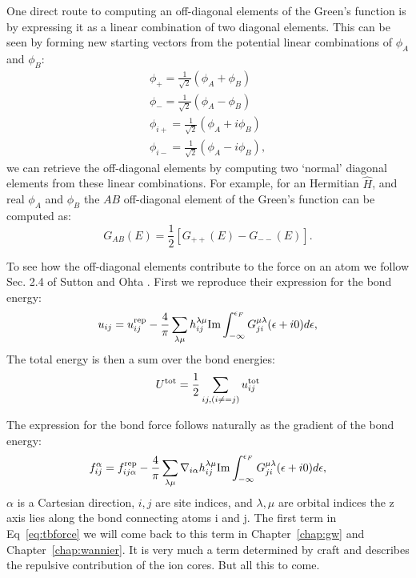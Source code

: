 One direct route to computing an off-diagonal elements of the Green's function
is by expressing it as a linear combination of two diagonal elements. 
This can be seen by forming new starting vectors 
from the potential linear combinations of $\phi_{A}$ and $\phi_{B}$:
%
\begin{align}
\phi_{+} = \frac{1}{\sqrt{2}}(\phi_{A} + \phi_{B})\\
\phi_{-} = \frac{1}{\sqrt{2}}(\phi_{A} - \phi_{B})\\
\phi_{i+} = \frac{1}{\sqrt{2}}(\phi_{A} + i\phi_{B})\\
\phi_{i-} = \frac{1}{\sqrt{2}}(\phi_{A} - i\phi_{B}),
\end{align}
%
we can retrieve the off-diagonal elements by computing 
two `normal' diagonal elements from these linear combinations.
For example, for an Hermitian $\hat{H}$, and real $\phi_{A}$ and $\phi_{B}$ 
the $AB$ off-diagonal element of the Green's function can be computed as:
%
\begin{equation}
\label{eq:offdiaggreen}
G_{AB}(E) = \frac{1}{2}[G_{++}(E)-G_{--}(E)].
\end{equation}

To see how the off-diagonal elements contribute to the force on an 
atom we follow Sec. 2.4 of Sutton \cite{sutton88} and Ohta \cite{ohta87}.
First we reproduce their expression for the bond energy:
%
\begin{equation}
\label{eq:tbenergy}
u_{ij} = u^{\rm rep}_{ij} - \frac{4}{\pi}\sum_{\lambda\mu} 
h_{ij}^{\lambda\mu}{\rm Im}\int_{-\infty}^{\epsilon_{F}}G_{ji}^{\mu\lambda}(\epsilon+i0)d\epsilon,
\end{equation}
%
The total energy is then a sum over the bond energies:
%
\begin{equation}
\label{eq:tbtoten}
U^{\rm tot} = \frac{1}{2}\sum_{ij,(i\neq=j)}u^{\rm tot}_{ij}
\end{equation}
%

The expression for the bond force follows naturally as the gradient of the bond energy:
%
\begin{equation}
\label{eq:tbforce}
f_{ij}^{\alpha} = f^{\rm rep}_{ij\alpha} - \frac{4}{\pi}\sum_{\lambda\mu} 
\nabla_{i\alpha}h_{ij}^{\lambda\mu}{\rm Im}\int_{-\infty}^{\epsilon_{F}}G_{ji}^{\mu\lambda}(\epsilon+i0)d\epsilon,
\end{equation}
%
$\alpha$ is a Cartesian direction, $i,j$ are site indices, and $\lambda, \mu$ are orbital indices 
the z axis lies along the bond connecting atoms i and j. The first term in Eq~\ref{eq:tbforce} 
we will come back to this term in Chapter~\ref{chap:gw} and Chapter~\ref{chap:wannier}. 
It is very much a term determined by craft and describes the repulsive contribution of the ion cores. 
But all this to come. 

